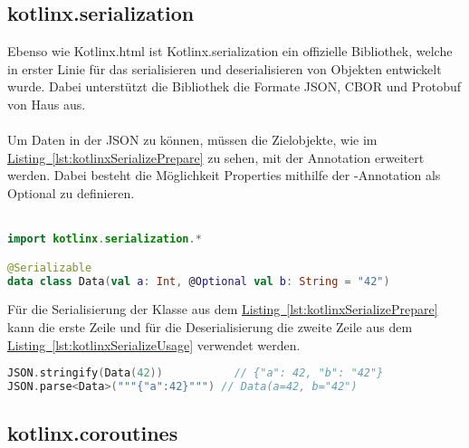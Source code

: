 \subsection{kotlinx.serialization}\label{sec:kotlinxSerialization}
Ebenso wie Kotlinx.html ist Kotlinx.serialization ein offizielle Bibliothek, welche in erster Linie für das serialisieren und deserialisieren von Objekten entwickelt wurde. Dabei unterstützt die Bibliothek die Formate \gls{JSON}, \gls{CBOR} und Protobuf von Haus aus. \cite{kotlinxSerialization}\\
\\
Um Daten in der \gls{JSON} zu können, müssen die Zielobjekte, wie im \hyperref[lst:kotlinxSerializePrepare]{Listing~\ref{lst:kotlinxSerializePrepare}} zu sehen, mit der Annotation  erweitert werden. Dabei besteht die Möglichkeit Properties mithilfe der -Annotation als Optional zu definieren.\\
\\
\begin{lstlisting}[style=lstStyleFramed, language=Kotlin, caption={Beispiel: Model-Erweiterung für Unterstützung der Kotlinx.serialization Bibliothek (verändert nach \cite{kotlinxSerialization})}, label=lst:kotlinxSerializePrepare, float]
import kotlinx.serialization.*

@Serializable
data class Data(val a: Int, @Optional val b: String = "42")
\end{lstlisting}
Für die Serialisierung der Klasse  aus dem
\hyperref[lst:kotlinxSerializePrepare]{Listing~\ref{lst:kotlinxSerializePrepare}} kann die erste Zeile und für die Deserialisierung die zweite Zeile aus dem \hyperref[lst:kotlinxSerializeUsage]{Listing~\ref{lst:kotlinxSerializeUsage}} verwendet werden.
\begin{lstlisting}[style=lstStyleFramed, language=Kotlin, caption={Beispiel: Serializierung und Deserialisierung der \code{Data} Klasse (verändert nach \cite{kotlinxSerialization})}, label=lst:kotlinxSerializeUsage, float]
JSON.stringify(Data(42))   		   // {"a": 42, "b": "42"}
JSON.parse<Data>("""{"a":42}""") // Data(a=42, b="42")
\end{lstlisting}

\subsection{kotlinx.coroutines}\label{sec:kotlinxCoroutines}



